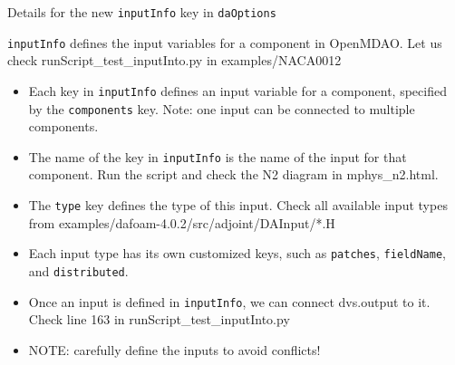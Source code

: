 \documentclass{bredelebeamer}
\begin{document}
\begin{frame}{Details for the new \texttt{inputInfo} key in \texttt{daOptions}}

  \texttt{inputInfo} defines the input variables for a component in OpenMDAO. Let us check runScript\_test\_inputInto.py in examples/NACA0012
  
  \begin{itemize}
  
    \item Each key in \texttt{inputInfo} defines an input variable for a component, specified by the \texttt{components} key. Note: one input can be connected to multiple components.
    \item The name of the key in \texttt{inputInfo} is the name of the input for that component. Run the script and check the N2 diagram in mphys\_n2.html.
    \item The \texttt{type} key defines the type of this input. Check all available input types from examples/dafoam-4.0.2/src/adjoint/DAInput/*.H
    \item Each input type has its own customized keys, such as \texttt{patches}, \texttt{fieldName}, and \texttt{distributed}.
    \item Once an input is defined in \texttt{inputInfo}, we can connect dvs.output to it. Check line 163 in runScript\_test\_inputInto.py
    \item NOTE: carefully define the inputs to avoid conflicts!
  \end{itemize}
  
  \end{frame}
\end{document}
